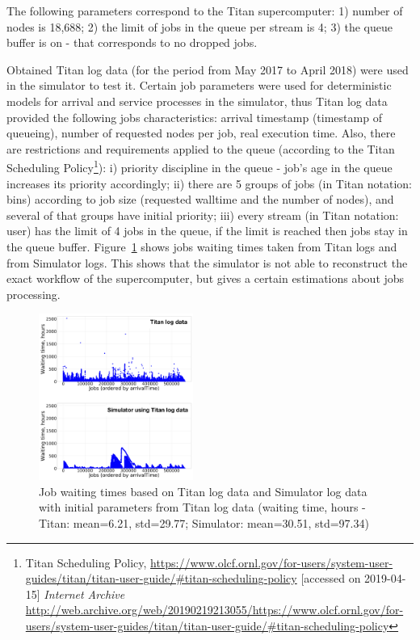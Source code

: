 The following parameters correspond to the Titan supercomputer: 
1) number of nodes is 18,688; 
2) the limit of jobs in the queue per stream is 4; 
3) the queue buffer is on - that corresponds to no dropped jobs.

Obtained Titan log data (for the period from May 2017 to April 2018) were used in the simulator to test it. Certain job parameters were used for deterministic models for arrival and service processes in the simulator, thus Titan log data provided the following jobs characteristics: arrival timestamp (timestamp of queueing), number of requested nodes per job, real execution time. Also, there are restrictions and requirements applied to the queue (according to the Titan Scheduling Policy\footnote{Titan Scheduling Policy, \url{https://www.olcf.ornl.gov/for-users/system-user-guides/titan/titan-user-guide/#titan-scheduling-policy} [accessed on 2019-04-15] \textit{Internet Archive} \url{http://web.archive.org/web/20190219213055/https://www.olcf.ornl.gov/for-users/system-user-guides/titan/titan-user-guide/#titan-scheduling-policy}}): i) priority discipline in the queue - job's age in the queue increases its priority accordingly; ii) there are 5 groups of jobs (in Titan notation: bins) according to job size (requested walltime and the number of nodes), and several of that groups have initial priority; iii) every stream (in Titan notation: user) has the limit of 4 jobs in the queue, if the limit is reached then jobs stay in the queue buffer. Figure~\ref{fig-simulator-testing} shows jobs waiting times taken from Titan logs and from Simulator logs. This shows that the simulator is not able to reconstruct the exact workflow of the supercomputer, but gives a certain estimations about jobs processing.

\begin{figure}
    \centering
    \includegraphics[width=0.45\textwidth]{pics/simulator-testing.png}
    \caption{Job waiting times based on Titan log data and Simulator log data with initial parameters from Titan log data (waiting time, hours - Titan: mean=6.21, std=29.77; Simulator: mean=30.51, std=97.34)}
    \label{fig-simulator-testing} 
\end{figure}


